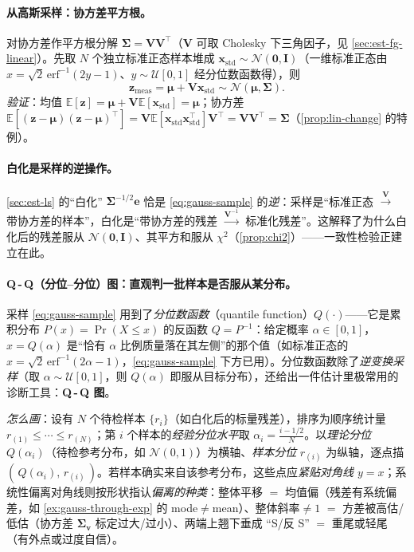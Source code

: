 \paragraph{从高斯采样：协方差平方根。}
对协方差作平方根分解 $\boldsymbol{\Sigma}=\mathbf{V}\mathbf{V}^\top$（$\mathbf{V}$ 可取 Cholesky 下三角因子，见 \cref{sec:est-fg-linear}）。先取 $N$ 个独立标准正态样本堆成 $\mathbf{x}_{\text{std}}\sim\mathcal{N}(\mathbf{0},\mathbf{I})$（一维标准正态由 $x=\sqrt{2}\,\mathrm{erf}^{-1}(2y-1)$、$y\sim\mathcal{U}[0,1]$ 经分位数函数得），则
\begin{equation}
  \mathbf{z}_{\text{meas}}=\boldsymbol{\mu}+\mathbf{V}\mathbf{x}_{\text{std}}\sim\mathcal{N}(\boldsymbol{\mu},\boldsymbol{\Sigma}).
  \label{eq:gauss-sample}
\end{equation}
\emph{验证}：均值 $\mathbb{E}[\mathbf{z}]=\boldsymbol{\mu}+\mathbf{V}\mathbb{E}[\mathbf{x}_{\text{std}}]=\boldsymbol{\mu}$；协方差 $\mathbb{E}[(\mathbf{z}-\boldsymbol{\mu})(\mathbf{z}-\boldsymbol{\mu})^\top]=\mathbf{V}\mathbb{E}[\mathbf{x}_{\text{std}}\mathbf{x}_{\text{std}}^\top]\mathbf{V}^\top=\mathbf{V}\mathbf{V}^\top=\boldsymbol{\Sigma}$（\cref{prop:lin-change} 的特例）。

\paragraph{白化是采样的逆操作。}
\cref{sec:est-ls} 的“白化” $\boldsymbol{\Sigma}^{-1/2}\mathbf{e}$ 恰是 \cref{eq:gauss-sample} 的\emph{逆}：采样是“标准正态 $\xrightarrow{\mathbf{V}}$ 带协方差的样本”，白化是“带协方差的残差 $\xrightarrow{\mathbf{V}^{-1}}$ 标准化残差”。这解释了为什么白化后的残差服从 $\mathcal{N}(\mathbf{0},\mathbf{I})$、其平方和服从 $\chi^2$（\cref{prop:chi2}）——一致性检验正建立在此。

\paragraph{Q\,-\,Q（分位–分位）图：直观判一批样本是否服从某分布。}
采样 \cref{eq:gauss-sample} 用到了\emph{分位数函数}（quantile function）$Q(\cdot)$——它是累积分布 $P(x)=\Pr(X\le x)$ 的反函数 $Q=P^{-1}$：给定概率 $\alpha\in[0,1]$，$x=Q(\alpha)$ 是“恰有 $\alpha$ 比例质量落在其左侧”的那个值（如标准正态的 $x=\sqrt{2}\,\mathrm{erf}^{-1}(2\alpha-1)$，\cref{eq:gauss-sample} 下方已用）。分位数函数除了\emph{逆变换采样}（取 $\alpha\sim\mathcal{U}[0,1]$，则 $Q(\alpha)$ 即服从目标分布），还给出一件估计里极常用的诊断工具：\textbf{Q\,-\,Q 图}\cite{barfoot2024state}。

\emph{怎么画}：设有 $N$ 个待检样本 $\{r_i\}$（如白化后的标量残差），排序为顺序统计量 $r_{(1)}\le\cdots\le r_{(N)}$；第 $i$ 个样本的\emph{经验分位水平}取 $\alpha_i=\tfrac{i-1/2}{N}$。以\emph{理论分位} $Q(\alpha_i)$（待检参考分布，如 $\mathcal{N}(0,1)$）为横轴、\emph{样本分位} $r_{(i)}$ 为纵轴，逐点描 $(\,Q(\alpha_i),\,r_{(i)}\,)$。若样本确实来自该参考分布，这些点应\emph{紧贴对角线 $y=x$}；系统性偏离对角线则按形状指认\emph{偏离的种类}：整体平移 $=$ 均值偏（残差有系统偏差，如 \cref{ex:gauss-through-exp} 的 mode$\ne$mean）、整体斜率$\ne1$ $=$ 方差被高估/低估（协方差 $\boldsymbol{\Sigma}_{\mathbf{v}}$ 标定过大/过小）、两端上翘下垂成 “S/反 S” $=$ 重尾或轻尾（有外点或过度自信）。

